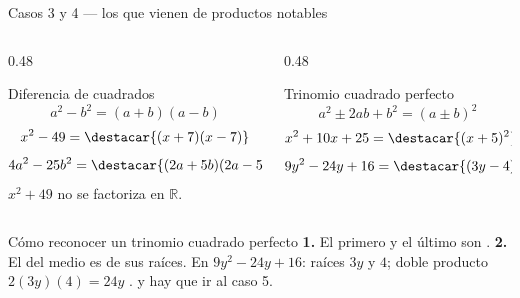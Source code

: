 \documentclass[aspectratio=169,10pt]{beamer}
\begin{document}
\begin{frame}{Casos 3 y 4 — los que vienen de productos notables}
  \scriptsize
  \begin{columns}[T,onlytextwidth]
    \begin{column}{0.48\textwidth}
      \begin{block}{Diferencia de cuadrados}
        \tiny
        \[ a^{2}-b^{2} = (a+b)(a-b) \]
        \[ x^{2}-49 = \destacar{(x+7)(x-7)} \]
        \[ 4a^{2}-25b^{2} = \destacar{(2a+5b)(2a-5b)} \]
         $x^2+49$ no se factoriza en $\mathbb{R}$.
      \end{block}
    \end{column}
    \begin{column}{0.48\textwidth}
      \begin{block}{Trinomio cuadrado perfecto}
        \tiny
        \[ a^{2}\pm 2ab+b^{2} = (a\pm b)^{2} \]
        \[ x^{2}+10x+25 = \destacar{(x+5)^{2}} \]
        \[ 9y^{2}-24y+16 = \destacar{(3y-4)^{2}} \]
      \end{block}
    \end{column}
  \end{columns}

  \vspace{0.1cm}
  \begin{alertblock}{Cómo reconocer un trinomio cuadrado perfecto}
    \scriptsize
    \textbf{1.} El primero y el último son . \quad
    \textbf{2.} El del medio es  de sus raíces.
    \vspace{0.06cm}
    En $9y^{2}-24y+16$: raíces $3y$ y $4$; doble producto
    $2(3y)(4) = 24y$ \checkmark.  y hay que ir al caso 5.
  \end{alertblock}
\end{frame}
\end{document}
